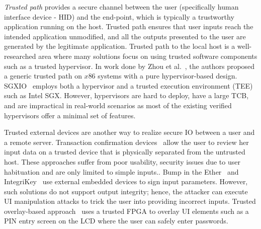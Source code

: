 \emph{Trusted path} provides a secure channel between the user (specifically human interface device - HID) and the end-point, which is typically a trustworthy application running on the host. Trusted path ensures that user inputs reach the intended application unmodified, and all the outputs presented to the user are generated by the legitimate application. Trusted path to the local host is a well-researched area where many solutions focus on using trusted software components such as a trusted hypervisor. In work done by Zhou et al.~\cite{zhou2012building}, the authors proposed a generic trusted path on $x86$ systems with a pure hypervisor-based design. SGXIO~\cite{weiser2017sgxio} employs both a hypervisor and a trusted execution environment (TEE) such as Intel SGX. However, hypervisors are hard to deploy, have a large TCB, and are impractical in real-world scenarios as most of the existing verified hypervisors offer a minimal set of features. 


Trusted external devices are another way to realize secure IO between a user and a remote server. Transaction confirmation devices~\cite{filyanov2011uni,weigold2011secure} allow the user to review her input data on a trusted device that is physically separated from the untrusted host. These approaches suffer from poor usability, security issues due to user habituation and are only limited to simple inputs.. Bump in the Ether~\cite{McCPerRei2006} and IntegriKey~\cite{IntegriKey} use external embedded devices to sign input parameters. However, such solutions do not support output integrity; hence, the attacker can execute UI manipulation attacks to trick the user into providing incorrect inputs. Trusted overlay-based approach~\cite{brandon2017trusted} uses a trusted FPGA to overlay UI elements such as a PIN entry screen on the LCD where the user can safely enter passwords. 


